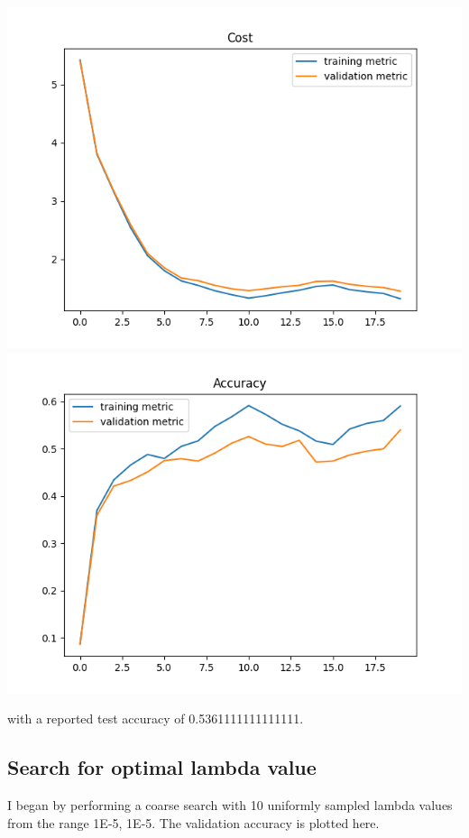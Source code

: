\documentclass[11pt,a4paper]{article}
\begin{document}
\includegraphics[width=\textwidth]{cost_k=2_batch_norm.png}
\includegraphics[width=\textwidth]{accuracy_k=2_batch_norm.png}

with a reported test accuracy of 0.5361111111111111.

\subsection{Search for optimal lambda value}

I began by performing a coarse search with 10 uniformly sampled lambda values from the range 1E-5, 1E-5. The validation accuracy is plotted here.
\end{document}
